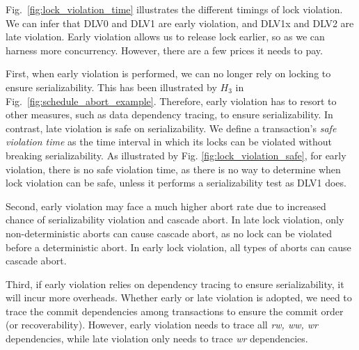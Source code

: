 \documentclass[conference]{IEEEtran}
\begin{document}
Fig.~\ref{fig:lock_violation_time} illustrates the different timings of lock violation.
We can infer that DLV0 and DLV1 are early violation, and DLV1x and DLV2 are late violation.
Early violation allows us to release lock earlier, so as we can harness more concurrency. However, there are a few prices it needs to pay.

First, when early violation is performed, we can no longer rely on locking to ensure serializability. This has been illustrated by ${H_3}$ in Fig.~\ref{fig:schedule_abort_example}.
Therefore, early violation has to resort to other measures, such as data dependency tracing, to ensure serializability.
In contrast, late violation is safe on serializability.
We define a transaction's \emph{safe violation time} as the time interval in which its locks can be violated without breaking serializability.
As illustrated by Fig. \ref{fig:lock_violation_safe},
for early violation, there is no safe violation time, as there is no way to determine when lock violation can be safe, unless it performs a serializability test as DLV1 does.

Second, early violation may face a much higher abort rate due to increased chance of serializability violation and cascade abort.
In late lock violation, only non-deterministic aborts can cause cascade abort, as no lock can be violated before a deterministic abort.
In early lock violation, all types of aborts can cause cascade abort.

Third, if early violation relies on dependency tracing to ensure serializability, it will incur more overheads.
Whether early or late violation is adopted, we need to trace the commit dependencies among transactions to ensure the commit order (or recoverability).
However, early violation needs to trace all \emph{rw, ww, wr} dependencies, while late violation only needs to trace \emph{wr} dependencies.
\end{document}
